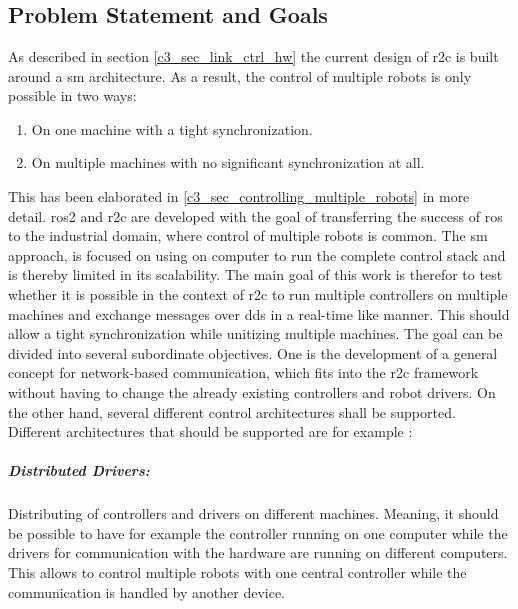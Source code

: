 \chapter{}
\label{sec:concept}

\section{Problem Statement and Goals}
As described in section \ref{c3_sec_link_ctrl_hw} the current design of \gls{r2c} is built around a \gls{sm} architecture. As a result, the control of multiple robots is only possible in two ways: 
\begin{enumerate}
    \item On one machine with a tight synchronization. 
    \item On multiple machines with no significant synchronization at all.
\end{enumerate}
This has been elaborated in \ref{c3_sec_controlling_multiple_robots} in more detail. \gls{ros2} and \gls{r2c} are developed with the goal of transferring the success of \gls{ros} to the industrial domain, where control of multiple robots is common. The \gls{sm} approach, is focused on using on computer to run the complete control stack and is thereby limited in its scalability. The main goal of this work is therefor to  test whether it is possible in the context of \gls{r2c} to run multiple controllers on multiple machines and exchange messages over \gls{dds} in a real-time like manner. This should allow a tight synchronization while unitizing multiple machines.\newline
The goal can be divided into several subordinate objectives. One is the development of a general concept for network-based communication, which fits into the \gls{r2c} framework without having to change the already existing controllers and robot drivers. On the other hand, several different control architectures shall be supported. Different architectures that should be supported are for example :
\paragraph{Distributed Drivers:}
 Distributing of controllers and drivers on different machines. Meaning, it should be possible to have for example the controller running on one computer while the drivers for communication with the hardware are running on different computers. This allows to control multiple robots with one central controller while the communication is handled by another device.

